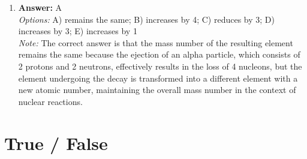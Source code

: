 \documentclass[12pt]{article}
\begin{document}
\begin{enumerate}[label=\arabic*.]
\item \textbf{Answer:} A
\\ \textit{Options:} A) remains the same; B) increases by 4; C) reduces by 3; D) increases by 3; E) increases by 1
\\ \textit{Note:} The correct answer is that the mass number of the resulting element remains the same because the ejection of an alpha particle, which consists of 2 protons and 2 neutrons, effectively results in the loss of 4 nucleons, but the element undergoing the decay is transformed into a different element with a new atomic number, maintaining the overall mass number in the context of nuclear reactions.
\end{enumerate}

\section*{True / False}
\end{document}

